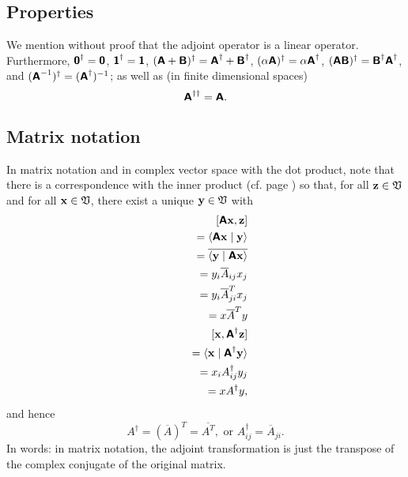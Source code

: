 \subsection{Properties}
We mention without proof that the adjoint operator is a linear operator.
Furthermore,
$\textsf{\textbf{0}}^\dagger = \textsf{\textbf{0}}$,
$\textsf{\textbf{1}}^\dagger = \textsf{\textbf{1}}$,
$(\textsf{\textbf{A}}+\textsf{\textbf{B}})^\dagger = \textsf{\textbf{A}}^\dagger+\textsf{\textbf{B}}^\dagger$,
$(\alpha \textsf{\textbf{A}})^\dagger = \alpha \textsf{\textbf{A}}^\dagger$,
$( \textsf{\textbf{A}}\textsf{\textbf{B}})^\dagger =   \textsf{\textbf{B}}^\dagger
 \textsf{\textbf{A}}^\dagger$,
and
$( \textsf{\textbf{A}}^{-1})^\dagger
=
( \textsf{\textbf{A}}^\dagger )^{-1}
$;
as well as  (in finite dimensional spaces)
\begin{equation}
\textsf{\textbf{A}}^{\dagger \dagger}=
\textsf{\textbf{A}}.
\end{equation}

\subsection{Matrix notation}

In matrix notation and in complex vector space with the dot product,
note that there is a correspondence with the inner product
(cf. page \pageref{2011-m-corr-bil-ip})
so that, for all ${\bf z}\in {\frak V}$ and for all ${\bf x}\in {\frak V}$,
 there exist a unique ${\bf y}\in {\frak V}$ with
\begin{equation}
\begin{split}
[\textsf{\textbf{A}}{\bf x}, {\bf z}]\\
\qquad =\langle \textsf{\textbf{A}} {\bf x}\mid {\bf y}\rangle  \\
\qquad =\overline{ \langle{\bf y}\mid \textsf{\textbf{A}} {\bf x}\rangle } \\
\qquad = y_i\overline{ A}_{ij} x_j  \\
\qquad = y_i\overline{ A}_{ji}^T x_j  \\
\qquad \qquad  = x\overline{ A}^T y\\
[{\bf x}, \textsf{\textbf{A}}^\dagger {\bf z}]\\
\qquad =
\langle {\bf x}\mid \textsf{\textbf{A}}^\dagger {\bf y}\rangle        \\
\qquad = x_i A_{ij}^\dagger y_j   \\
\qquad \qquad   =   x A ^\dagger y,
\end{split}
\end{equation}
and hence
\begin{equation}
A ^\dagger =(\overline{ A})^T =\overline{ A^T}, \textrm{ or } A^\dagger_{ij}=\overline{A}_{ji} .
\end{equation}
In words: in matrix notation, the adjoint transformation is just the
transpose of the complex conjugate of the original matrix.

